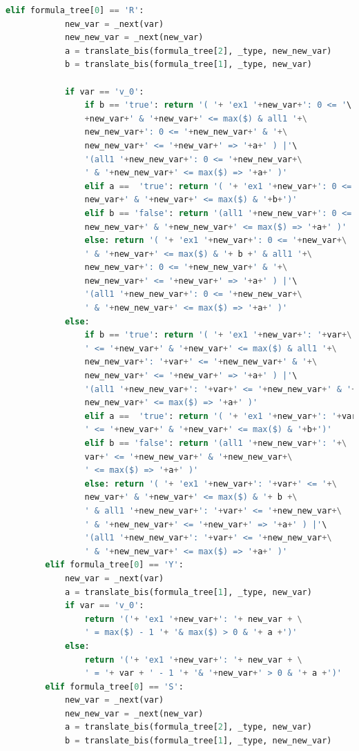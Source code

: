\begin{lstlisting}[language=Python, style=Python, escapechar = £,  label={code:ltlf2dfa-translate-method}, caption={The \texttt{translate} method.}]
        elif formula_tree[0] == 'R':
            new_var = _next(var)
            new_new_var = _next(new_var)
            a = translate_bis(formula_tree[2], _type, new_new_var)
            b = translate_bis(formula_tree[1], _type, new_var)

            if var == 'v_0':
                if b == 'true': return '( '+ 'ex1 '+new_var+': 0 <= '\
                +new_var+' & '+new_var+' <= max($) & all1 '+\
                new_new_var+': 0 <= '+new_new_var+' & '+\
                new_new_var+' <= '+new_var+' => '+a+' ) |'\
                '(all1 '+new_new_var+': 0 <= '+new_new_var+\
                ' & '+new_new_var+' <= max($) => '+a+' )'
                elif a ==  'true': return '( '+ 'ex1 '+new_var+': 0 <= '+\
                new_var+' & '+new_var+' <= max($) & '+b+')'
                elif b == 'false': return '(all1 '+new_new_var+': 0 <= '+\
                new_new_var+' & '+new_new_var+' <= max($) => '+a+' )'
                else: return '( '+ 'ex1 '+new_var+': 0 <= '+new_var+\
                ' & '+new_var+' <= max($) & '+ b +' & all1 '+\
                new_new_var+': 0 <= '+new_new_var+' & '+\
                new_new_var+' <= '+new_var+' => '+a+' ) |'\
                '(all1 '+new_new_var+': 0 <= '+new_new_var+\
                ' & '+new_new_var+' <= max($) => '+a+' )'
            else:
                if b == 'true': return '( '+ 'ex1 '+new_var+': '+var+\
                ' <= '+new_var+' & '+new_var+' <= max($) & all1 '+\
                new_new_var+': '+var+' <= '+new_new_var+' & '+\
                new_new_var+' <= '+new_var+' => '+a+' ) |'\
                '(all1 '+new_new_var+': '+var+' <= '+new_new_var+' & '+\
                new_new_var+' <= max($) => '+a+' )'
                elif a ==  'true': return '( '+ 'ex1 '+new_var+': '+var+\
                ' <= '+new_var+' & '+new_var+' <= max($) & '+b+')'
                elif b == 'false': return '(all1 '+new_new_var+': '+\
                var+' <= '+new_new_var+' & '+new_new_var+\
                ' <= max($) => '+a+' )'
                else: return '( '+ 'ex1 '+new_var+': '+var+' <= '+\
                new_var+' & '+new_var+' <= max($) & '+ b +\
                ' & all1 '+new_new_var+': '+var+' <= '+new_new_var+\
                ' & '+new_new_var+' <= '+new_var+' => '+a+' ) |'\
                '(all1 '+new_new_var+': '+var+' <= '+new_new_var+\
                ' & '+new_new_var+' <= max($) => '+a+' )'                
        elif formula_tree[0] == 'Y':
            new_var = _next(var)
            a = translate_bis(formula_tree[1], _type, new_var)
            if var == 'v_0':
                return '('+ 'ex1 '+new_var+': '+ new_var + \
                ' = max($) - 1 '+ '& max($) > 0 & '+ a +')'
            else:
                return '('+ 'ex1 '+new_var+': '+ new_var + \
                ' = '+ var + ' - 1 '+ '& '+new_var+' > 0 & '+ a +')'
        elif formula_tree[0] == 'S':
            new_var = _next(var)
            new_new_var = _next(new_var)
            a = translate_bis(formula_tree[2], _type, new_var)
            b = translate_bis(formula_tree[1], _type, new_new_var)


\end{lstlisting}
